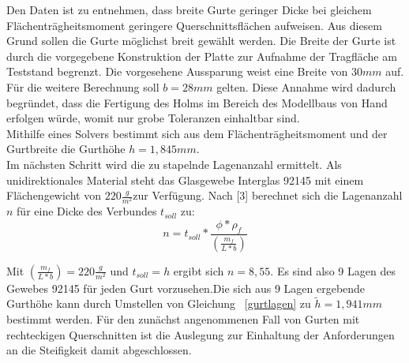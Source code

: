 \noindent Den Daten ist zu entnehmen, dass breite Gurte geringer Dicke bei gleichem Flächenträgheitsmoment geringere Querschnittsflächen aufweisen. Aus diesem Grund sollen die Gurte möglichst breit gewählt werden. Die Breite der Gurte ist durch die vorgegebene Konstruktion der Platte zur Aufnahme der Tragfläche am Teststand begrenzt. Die vorgesehene Aussparung weist eine Breite von $ 30mm $ auf. Für die weitere Berechnung soll $ b=28mm $ gelten. Diese Annahme wird dadurch begründet, dass die Fertigung des Holms im Bereich des Modellbaus von Hand erfolgen würde, womit nur grobe Toleranzen einhaltbar sind.\\

\noindent Mithilfe eines Solvers bestimmt sich aus dem Flächenträgheitsmoment und der Gurtbreite die Gurthöhe $ h=1,845mm $.\\
\noindent Im nächsten Schritt wird die zu stapelnde Lagenanzahl ermittelt. Als unidirektionales Material steht das Glasgewebe Interglas 92145 mit einem Flächengewicht von $ 220\frac{g}{m^{2}} $zur Verfügung. Nach [3] berechnet sich die Lagenanzahl $ n $ für eine Dicke des Verbundes $ t_{soll} $ zu:\\

\begin{equation}
	\label{gurtlagen}
	n=t_{soll}*\frac{\phi*\rho_{f}}{\left(\frac{m_{f}}{L*b}\right)}
\end{equation}

\noindent Mit $ \left(\frac{m_{f}}{L*b}\right) = 220\frac{g}{m^{2}} $ und $ t_{soll}=h $ ergibt sich $ n=8,55 $. Es sind also 9 Lagen des Gewebes 92145 für jeden Gurt vorzusehen.Die sich aus 9 Lagen ergebende Gurthöhe kann durch Umstellen von Gleichung ~\ref{gurtlagen} zu $ \tilde{h}=1,941mm $ bestimmt werden. Für den zunächst angenommenen Fall von Gurten mit rechteckigen Querschnitten ist die Auslegung zur Einhaltung der Anforderungen an die Steifigkeit damit abgeschlossen.\\



